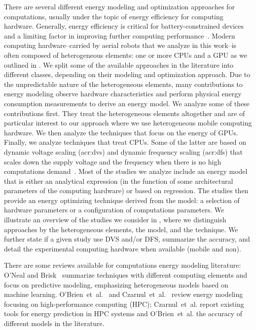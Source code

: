 There are several different energy modeling and optimization approaches for computations, usually under the topic of energy efficiency for computing hardware. Generally, energy efficiency is critical for battery-constrained devices~\citep{rao2005battery} and a limiting factor in improving further computing performance~\citep{horowitz2014computing}. 
Modern computing hardware--carried by aerial robots that we analyze in this work--is often composed of heterogeneous elements: one or more CPUs and a GPU as we outlined in . We split some of the available approaches in the literature into different classes, depending on their modeling and optimization approach. Due to the unpredictable nature of the heterogeneous elements, many contributions to energy modeling observe hardware characteristics and perform physical energy consumption measurements to derive an energy model. We analyze some of these contributions first. They treat the heterogeneous elements altogether and are of particular interest to our approach where we use heterogeneous mobile computing hardware. We then analyze the techniques that focus on the energy of GPUs. Finally, we analyze techniques that treat CPUs. Some of the latter are based on dynamic voltage scaling (\Gls{acr:dvs}) and dynamic frequency scaling (\Gls{acr:dfs}) that scales down the supply voltage and the frequency when there is no high computations demand~\citep{flautner2001automatic, chen2009fundamentals}. Most of the studies we analyze include an energy model that is either an analytical expression (in the function of some architectural parameters of the computing hardware) or based on regression. The studies then provide an energy optimizing technique derived from the model: a selection of hardware parameters or a configuration of computations parameters. We illustrate an overview of the studies we consider in , where we distinguish approaches by the heterogeneous elements, the model, and the technique. We further state if a given study use DVS and/or DFS, summarize the accuracy, and detail the experimental computing hardware when available (mobile and non).

There are some reviews available for computations energy modeling literature: O'Neal and Brisk~\citep{oneal2018predictive} summarize techniques with different computing elements and focus on predictive modeling, emphasizing heterogeneous models based on machine learning. O'Brien~et~al.~\citep{obrien2017survey} and Czarnul~et~al.~\citep{czarnul2019energy} review energy modeling focusing on high-performance computing (HPC); Czarnul~et~al. report existing tools for energy prediction in HPC systems and O'Brien~et~al. the accuracy of different models in the literature.

